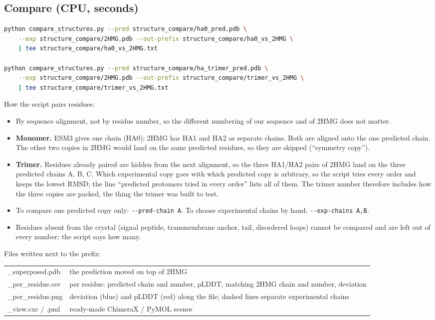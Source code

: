 \documentclass[11pt,a4paper]{article}
\newcommand{\file}[1]{\texttt{#1}}
\begin{document}
\subsection{Compare (CPU, seconds)}
\begin{lstlisting}[language=bash]
python compare_structures.py --pred structure_compare/ha0_pred.pdb \
    --exp structure_compare/2HMG.pdb --out-prefix structure_compare/ha0_vs_2HMG \
    | tee structure_compare/ha0_vs_2HMG.txt

python compare_structures.py --pred structure_compare/ha_trimer_pred.pdb \
    --exp structure_compare/2HMG.pdb --out-prefix structure_compare/trimer_vs_2HMG \
    | tee structure_compare/trimer_vs_2HMG.txt
\end{lstlisting}

How the script pairs residues:
\begin{itemize}
  \item By sequence alignment, not by residue number, so the different numbering
        of our sequence and of 2HMG does not matter.
  \item \textbf{Monomer.} ESM3 gives one chain (HA0); 2HMG has HA1 and HA2 as
        separate chains. Both are aligned onto the one predicted chain. The other
        two copies in 2HMG would land on the same predicted residues, so they are
        skipped (``symmetry copy'').
  \item \textbf{Trimer.} Residues already paired are hidden from the next
        alignment, so the three HA1/HA2 pairs of 2HMG land on the three
        predicted chains A, B, C. Which experimental copy goes with which
        predicted copy is arbitrary, so the script tries every order and keeps
        the lowest RMSD; the line ``predicted protomers tried in every order''
        lists all of them. The trimer number therefore includes how the three
        copies are packed, the thing the trimer was built to test.
  \item To compare one predicted copy only: \file{-{}-pred-chain A}. To choose
        experimental chains by hand: \file{-{}-exp-chains A,B}.
  \item Residues absent from the crystal (signal peptide, transmembrane anchor,
        tail, disordered loops) cannot be compared and are left out of every
        number; the script says how many.
\end{itemize}

Files written next to the prefix:
\begin{center}
\begin{tabular}{>{\ttfamily}l p{}}
\toprule
\_superposed.pdb   & the prediction moved on top of 2HMG \\
\_per\_residue.csv & per residue: predicted chain and number, pLDDT, matching 2HMG chain and number, deviation \\
\_per\_residue.png & deviation (blue) and pLDDT (red) along the file; dashed lines separate experimental chains \\
\_view.cxc / .pml  & ready-made ChimeraX / PyMOL scenes \\
\bottomrule
\end{tabular}
\end{center}
\end{document}
